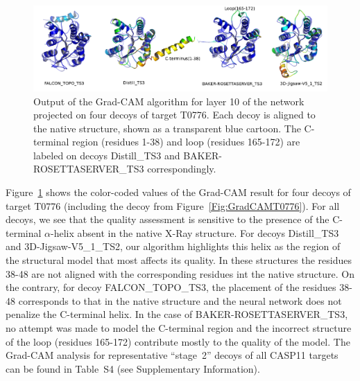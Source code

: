 \documentclass{bioinfo}
\begin{document}
%
\begin{figure}[!tbp]
    \includegraphics[width=\linewidth]{image7.png}
    \caption{Output of the Grad-CAM algorithm for layer 10 of the
      network projected on four decoys of target T0776. Each decoy is
      aligned to the native structure, shown as a transparent blue
      cartoon. The C-terminal region (residues 1-38) and loop (residues 165-172) 
      are labeled on decoys Distill\_TS3 and BAKER-ROSETTASERVER\_TS3 correspondingly.}
    \label{Fig:GradCAMT0776_more}
\end{figure}
%
Figure~\ref{Fig:GradCAMT0776_more} shows the color-coded values of the
Grad-CAM result for four decoys of target T0776 (including the decoy
from Figure~\ref{Fig:GradCAMT0776}).  For all decoys, we see that the
quality assessment is sensitive to the presence of the C-terminal
$\alpha$-helix absent in the native X-Ray structure. For decoys
Distill\_TS3 and 3D-Jigsaw-V5\_1\_TS2, our algorithm highlights this
helix as the region of the structural model that most affects its
quality. In these structures the residues 38-48 are not aligned with the corresponding residues 
int the native structure. On the contrary, for decoy FALCON\_TOPO\_TS3, 
the placement of the residues 38-48 corresponds to that in the native structure and
the neural network does not penalize the C-terminal helix.
In the case of BAKER-ROSETTASERVER\_TS3, no attempt was made to model the C-terminal region 
and the incorrect structure of the loop (residues 165-172) 
contribute mostly to the quality of the model.
%
The Grad-CAM analysis for representative ``stage~2''
decoys of all CASP11 targets can be found in Table~S4 (see
Supplementary Information).
\end{document}
